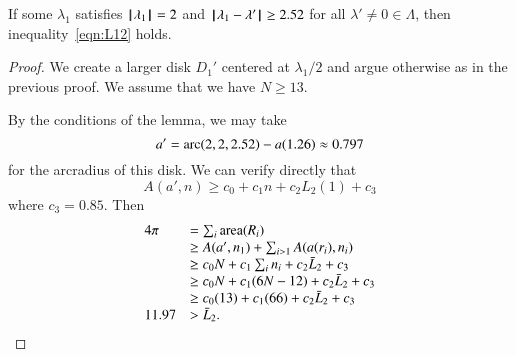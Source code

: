 \begin{lemma}\label{lemma:D'}  
If some $\lambda_1$ satisfies ${{\hskip0.1em|\hskip-0.15em|\hskip0.1em}\lambda_1{\hskip0.1em|\hskip-0.15em|\hskip0.1em}}=2$ and
${\hskip0.1em|\hskip-0.15em|\hskip0.1em}\lambda_1 - \lambda'{\hskip0.1em|\hskip-0.15em|\hskip0.1em}\ge 2.52$ for all $\lambda'\ne0\in\Lambda$,
then  inequality~\ref{eqn:L12} holds.
\end{lemma}

\begin{proof}  We create
a larger disk $D_1'$ centered at $\lambda_1/2$ and argue otherwise
as in the previous proof.  We assume that we have $N\ge 13$.


By the conditions of the lemma, we may take 
$$a'=\operatorname{arc}(2,2,2.52)-a(1.26) \approx 0.797$$
for the arcradius of this disk.  We can verify directly that
$$A(a',n) \ge c_0 + c_1 n + c_2 L_2(1) + c_3$$
where $c_3 = 0.85$.
Then 
$$
\begin{array}{lll}
4\pi &= \sum_i{\operatorname{area}}(R_i)\\
     &\ge A(a',n_1)+\sum_{i>1} A(a(r_i),n_i) \\
     &\ge  c_0 N +c_1\sum_i n_i + c_2 \bar L_2 + c_3\\
     &\ge c_0 N +c_1 (6N-12) + c_2 \bar L_2 + c_3\\
     &\ge  c_0 (13) +c_1 (66) + c_2 \bar L_2 + c_3\\
11.97 &> \bar L_2. 
\end{array}
$$
\end{proof}

